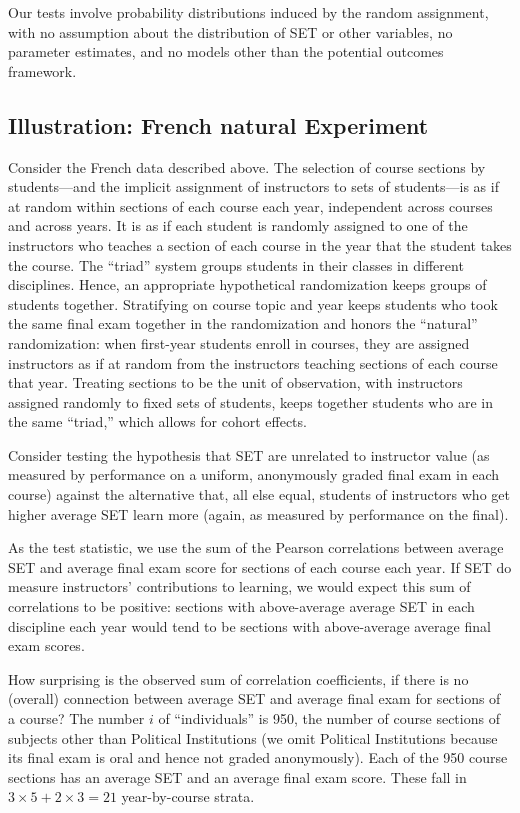 \documentclass[12pt]{article}
\begin{document}
Our tests involve probability distributions induced by the random
assignment, with no assumption about the distribution of SET or other variables, 
no parameter estimates, and no models other than the potential outcomes 
framework.

\subsection{Illustration: French natural Experiment} \label{sec:boringMethods}
Consider the French data described above. 
The selection of course sections by students---and the implicit assignment of instructors to sets of students---is as if at random within sections of each
course each year, independent across courses and across years.
It is as if each student is randomly assigned to one of the instructors who teaches a section of each
course in the year that the student takes the course.
The ``triad'' system groups students in their classes in different disciplines.
Hence, an appropriate hypothetical randomization keeps groups of students
together.
Stratifying on course topic and year keeps students who took the same final
exam together in the randomization and honors the ``natural'' randomization:
when first-year students enroll in courses, they are assigned instructors as if
at random from the instructors teaching sections of each course that year.
Treating sections to be the unit of observation, with instructors assigned randomly to
fixed sets of students, keeps together students who are in the same ``triad,'' which
allows for cohort effects. 

Consider testing the hypothesis that SET are unrelated to instructor value (as 
measured by performance on a uniform, anonymously graded final exam in each course)
against the alternative that, all else equal, students of instructors who get higher average SET
learn more (again, as measured by performance on the final).

As the test statistic, we use the sum of the Pearson correlations between
average SET and average final exam score for sections of each course each year.
If SET do measure instructors' contributions to learning, we would expect this sum of
correlations to be positive: sections with above-average average SET in each discipline each year
would tend to be sections with above-average average final exam scores.

How surprising is the observed sum of correlation coefficients, if there is no (overall) 
connection between
average SET and average final exam for sections of a course?
The number $i$ of ``individuals'' is 950, the number of course sections of subjects other
than Political Institutions (we omit Political Institutions because its final exam is oral 
and hence not graded anonymously).
Each of the 950 course sections has an average SET and an average final exam score.
These fall in $3\times5 + 2 \times 3 = 21$ year-by-course strata.
 
\end{document}
